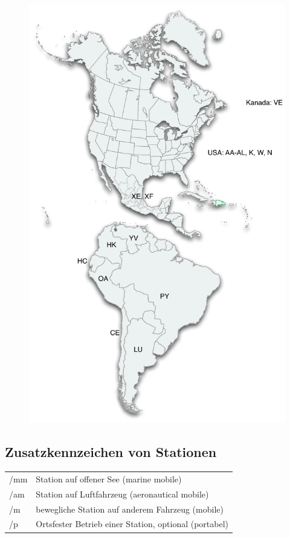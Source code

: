 \documentclass[11pt,BCOR=8.5mm]{scrartcl}
\begin{document}
\begin{figure}[htbp]
  \begin{center}
	\includegraphics[width=14cm]{figures/landeskenner-amerika}
	\label{fig:landeskenner-amerika}
  \end{center}
\end{figure}


\subsection{Zusatzkennzeichen von Stationen}\label{sub:zusatzkennzeichen}
\begin{table}[h]
  \centering
\begin{tabular}{|l|l|}
  \hline
  /mm & Station auf offener See (marine mobile) \\
  /am & Station auf Luftfahrzeug (aeronautical mobile) \\
  /m & bewegliche Station auf anderem Fahrzeug (mobile) \\
  /p & Ortsfester Betrieb einer Station, optional (portabel) \\
  \hline
\end{tabular}
\end{table}
\end{document}
